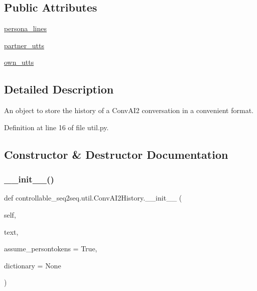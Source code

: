 \subsection*{Public Attributes}
\begin{DoxyCompactItemize}
\item 
\hyperlink{classcontrollable__seq2seq_1_1util_1_1ConvAI2History_a2a5b63d3b0762fe38e6353a26c430998}{persona\+\_\+lines}
\item 
\hyperlink{classcontrollable__seq2seq_1_1util_1_1ConvAI2History_af5523b045a96f91e7dafc5d9088e4993}{partner\+\_\+utts}
\item 
\hyperlink{classcontrollable__seq2seq_1_1util_1_1ConvAI2History_af8973aa261b7a1bac44f999993f8376a}{own\+\_\+utts}
\end{DoxyCompactItemize}


\subsection{Detailed Description}
\begin{DoxyVerb}An object to store the history of a ConvAI2 conversation in a convenient format.
\end{DoxyVerb}
 

Definition at line 16 of file util.\+py.



\subsection{Constructor \& Destructor Documentation}
\mbox{\label{classcontrollable__seq2seq_1_1util_1_1ConvAI2History_af36e292c392c06ca0d61c29450f09dc0}} 
\subsubsection{\texorpdfstring{\+\_\+\+\_\+init\+\_\+\+\_\+()}{\_\_init\_\_()}}
{\footnotesize\ttfamily def controllable\+\_\+seq2seq.\+util.\+Conv\+A\+I2\+History.\+\_\+\+\_\+init\+\_\+\+\_\+ (\begin{DoxyParamCaption}\item[{}]{self,  }\item[{}]{text,  }\item[{}]{assume\+\_\+persontokens = {\ttfamily True},  }\item[{}]{dictionary = {\ttfamily None} }\end{DoxyParamCaption})}

